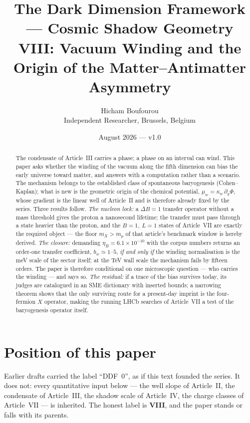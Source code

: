 \documentclass[11pt,a4paper]{article}
\title{\textbf{The Dark Dimension Framework --- Cosmic Shadow Geometry\\[4pt]
VIII: Vacuum Winding and the Origin of the Matter--Antimatter Asymmetry}}
\author{Hicham Boufourou\\ \small Independent Researcher, Brussels, Belgium}
\date{August 2026 --- v1.0}
\begin{document}
\maketitle

\begin{abstract}
\noindent
The condensate of Article~III carries a phase; a phase on an interval can wind.
This paper asks whether the winding of the vacuum along the fifth dimension can
bias the early universe toward matter, and answers with a computation rather
than a scenario. The mechanism belongs to the established class of spontaneous
baryogenesis (Cohen--Kaplan); what is new is the geometric origin of the
chemical potential, $\mu_w=\kappa_w\,\partial_y\Phi$, whose gradient is the
linear well of Article~II and is therefore already fixed by the series. Three
results follow. \emph{The nucleon lock:} a $\Delta B=1$ transfer operator
without a mass threshold gives the proton a nanosecond lifetime; the transfer
must pass through a state heavier than the proton, and the $B=1,\ L=1$ states
of Article~VII are exactly the required object --- the floor $m_X>m_p$ of that
article's benchmark window is hereby derived. \emph{The closure:} demanding
$\eta_B=6.1\times10^{-10}$ with the corpus numbers returns an order-one
transfer coefficient, $b_w\simeq1$--$5$, \emph{if and only if} the winding
normalisation is the meV scale of the sector itself; at the TeV wall scale the
mechanism fails by fifteen orders. The paper is therefore conditional on one
microscopic question --- who carries the winding --- and says so.
\emph{The residual:} if a trace of the bias survives today, its judges are
catalogued in an SME dictionary with inserted bounds; a narrowing theorem shows
that the only surviving route for a present-day imprint is the four-fermion $X$
operator, making the running LHCb searches of Article~VII a test of the
baryogenesis operator itself.
\end{abstract}

\section{Position of this paper}
\label{sec:position}

Earlier drafts carried the label ``DDF~0'', as if this text founded the
series. It does not: every quantitative input below --- the well slope of
Article~II, the condensate of Article~III, the shadow scale of Article~IV, the
charge classes of Article~VII --- is inherited. The honest label is
\textbf{VIII}, and the paper stands or falls with its parents.
\end{document}
